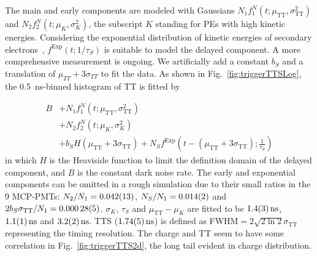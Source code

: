 The main and early components are modeled with Gaussians $N_1f_1^N(t;\mu_{\mathrm{TT}},\sigma_{\mathrm{TT}}^2)$ and $N_2f_2^N(t;\mu_K,\sigma_K^2)$, the subscript $K$ standing for PEs with high kinetic energies. Considering the exponential distribution of kinetic energies of secondary electrons~\cite{Furman,SecondElectron}, $f^\mathrm{Exp}(t;1/\tau_S)$ is suitable to model the delayed component.  A more comprehensive measurement is ongoing.  We artificially add a constant $b_S$ and a translation of $\mu_{TT} + 3\sigma_{TT}$ to fit the data. As shown in Fig.~\ref{fig:triggerTTSLog}, the \SI{0.5}{ns}-binned histogram of $\mathrm{TT}$ is fitted by

\begin{equation}
    \begin{aligned}
        B&+N_1f_1^N(t;\mu_{\mathrm{TT}},\sigma_{\mathrm{TT}}^2)\\
        &+N_2f_2^N(t;\mu_K,\sigma_K^2)\\
        &+b_SH(\mu_{\mathrm{TT}}+3\sigma_{\mathrm{TT}})+N_Sf^{\mathrm{Exp}}\left(t-(\mu_{\mathrm{TT}}+3\sigma_{\mathrm{TT}});\frac{1}{\tau_S}\right)
    \end{aligned}
\end{equation}
in which $H$ is the Heaviside function to limit the definition domain of the delayed component, and $B$ is the constant dark noise rate. The early and exponential components can be omitted in a rough simulation due to their small ratios in the 9 MCP-PMTs: $N_2/N_1 = \num{0.042\pm0.013}$, $N_S/N_1 = \num{0.014\pm0.002}$ and $2b_S\sigma_{\mathrm{TT}}/N_1 = \num{0.00028\pm0.00005}$.  $\sigma_K$, $\tau_S$ and $\mu_{\mathrm{TT}}-\mu_K$ are fitted to be $\SI{1.4 \pm 0.3}{ns}$, $\SI{1.1\pm 0.1}{ns}$ and $\SI{3.2\pm 0.2}{ns}$. TTS ($\SI{1.74\pm0.05}{ns}$) is defined as FWHM$=2\sqrt{2\ln 2}\sigma_{\mathrm{TT}}$~\cite{HAMAMATSUManual} representing the timing resolution. The charge and TT seem to have some correlation in Fig.~\ref{fig:triggerTTS2d}, the long tail evident in charge distribution.

